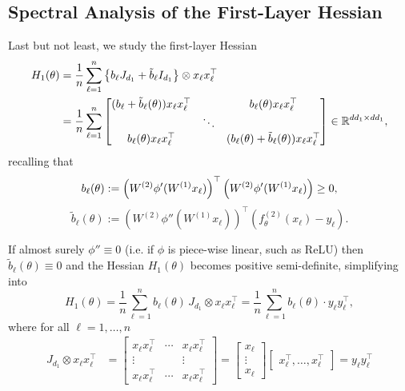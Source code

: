 \documentclass{article}
\begin{document}
\subsection{Spectral Analysis of the First-Layer Hessian}

Last but not least, we study the first-layer Hessian
\begin{align}
H_1(\theta) &= \frac{1}{n}\sum_{\ell=1}^n\left\{b_\ell J_{d_1}+\tilde{b}_\ell I_{d_1}\right\}\otimes x_\ell x_\ell^\top \label{eq:H1}
\\ &=
\frac{1}{n}\sum_{\ell=1}^n\begin{bmatrix} (b_\ell+\tilde{b}_\ell(\theta)) x_\ell x_\ell^\top 
& & b_\ell(\theta) x_\ell x_\ell^\top\\ & \ddots & \\ b_\ell(\theta) x_\ell x_\ell^\top & & (b_\ell(\theta)+\tilde{b}_\ell(\theta)) x_\ell x_\ell^\top \end{bmatrix} \in\mathbb{R}^{dd_1\times dd_1}, \notag
\end{align}
recalling that
\begin{equation}
b_\ell(\theta):=\left(W^{(2)}\phi'(W^{(1)}x_\ell)\right)^\top\left(W^{(2)}\phi'(W^{(1)}x_\ell)\right)\geq0,\notag
\end{equation}
\begin{equation}
\tilde{b}_\ell(\theta):=\left(W^{(2)}\phi''(W^{(1)}x_\ell)\right)^\top(f_\theta^{(2)}(x_\ell)-y_\ell).
\end{equation}
\bigskip
\par
If almost surely $\phi''\equiv 0$ (i.e. if $\phi$ is piece-wise linear, such as ReLU) then $\tilde{b}_\ell(\theta)\equiv 0$ and the Hessian $H_1(\theta)$ becomes positive semi-definite, simplifying into
\begin{equation}
H_1(\theta)=\frac{1}{n}\sum_{\ell=1}^n b_\ell(\theta)\, J_{d_1}\otimes x_\ell x_\ell^\top=\frac{1}{n}\sum_{\ell=1}^nb_\ell(\theta)\cdot y_\ell y_\ell^\top,\label{eq:special-H1}
\end{equation}
where for all $\ell=1,\dots, n$
\begin{align}
J_{d_1}\otimes x_\ell x_\ell^\top &= \begin{bmatrix}x_\ell x_\ell^\top&\cdots&x_\ell x_\ell^\top\\\vdots&&\vdots\\x_\ell x_\ell^\top&\cdots&x_\ell x_\ell^\top \end{bmatrix} = \begin{bmatrix}x_\ell\\\vdots\\ x_\ell\end{bmatrix}\begin{bmatrix}x_\ell^\top,\dots, x_\ell^\top\end{bmatrix} = y_\ell y_\ell^\top
\end{align}
\end{document}
